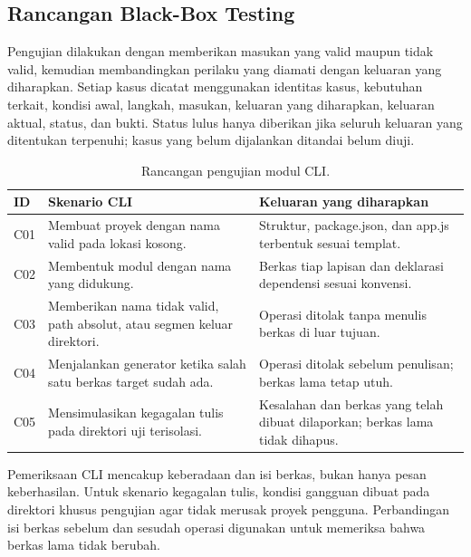 \documentclass[12pt,a4paper,oneside]{report}
\begin{document}
\subsection{Rancangan Black-Box Testing}
Pengujian dilakukan dengan memberikan masukan yang valid maupun tidak valid, kemudian membandingkan perilaku yang diamati dengan keluaran yang diharapkan. Setiap kasus dicatat menggunakan identitas kasus, kebutuhan terkait, kondisi awal, langkah, masukan, keluaran yang diharapkan, keluaran aktual, status, dan bukti. Status lulus hanya diberikan jika seluruh keluaran yang ditentukan terpenuhi; kasus yang belum dijalankan ditandai belum diuji.

\begin{table}[!htbp]
\centering\singlespacing\small
\begin{tabularx}{\textwidth}{@{}l >{\raggedright\arraybackslash}X >{\raggedright\arraybackslash}X@{}}
\toprule
\textbf{ID} & \textbf{Skenario CLI} & \textbf{Keluaran yang diharapkan} \\
\midrule
C01 & Membuat proyek dengan nama valid pada lokasi kosong. & Struktur, package.json, dan app.js terbentuk sesuai templat. \\
C02 & Membentuk modul dengan nama yang didukung. & Berkas tiap lapisan dan deklarasi dependensi sesuai konvensi. \\
C03 & Memberikan nama tidak valid, path absolut, atau segmen keluar direktori. & Operasi ditolak tanpa menulis berkas di luar tujuan. \\
C04 & Menjalankan generator ketika salah satu berkas target sudah ada. & Operasi ditolak sebelum penulisan; berkas lama tetap utuh. \\
C05 & Mensimulasikan kegagalan tulis pada direktori uji terisolasi. & Kesalahan dan berkas yang telah dibuat dilaporkan; berkas lama tidak dihapus. \\
\bottomrule
\end{tabularx}
\caption{Rancangan pengujian modul CLI.}
\label{tab:uji_cli}
\end{table}
\FloatBarrier

Pemeriksaan CLI mencakup keberadaan dan isi berkas, bukan hanya pesan keberhasilan. Untuk skenario kegagalan tulis, kondisi gangguan dibuat pada direktori khusus pengujian agar tidak merusak proyek pengguna. Perbandingan isi berkas sebelum dan sesudah operasi digunakan untuk memeriksa bahwa berkas lama tidak berubah.
\end{document}
